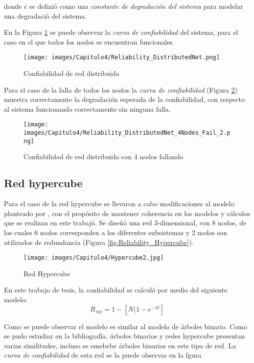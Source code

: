 donde c se definió como una \textit{constante de degradación del sistema} para modelar una degradació del sistema.

En la Figura \ref{fig:reliability_distributedNet} se puede observar la \textit{curva de confiabilidad} del sistema, para el caso en el que todos los nodos se encuentran funcionales.

\begin{figure}[H]
 \centering
 \texttt{[image: images/Capitulo4/Reliability\_DistributedNet.png]}
  \caption{Confiabilidad de red distribuida}
\label{fig:reliability_distributedNet}
\end{figure}


Para el caso de la falla de todos los nodos la \textit{curva de confiabilidad} (Figura \ref{fig:reliability_distributedNet_4Nodes_Fail}) muestra correctamente la degradación esperada de la confiabilidad, con respecto al sistema funcionando correctamente sin ninguna falla.

\begin{figure}[H]
 \centering
 \texttt{[image: images/Capitulo4/Reliability\_DistributedNet\_4Nodes\_Fail\_2.png]}
  \caption{Confiabilidad de red distribuida con 4 nodos fallando}
\label{fig:reliability_distributedNet_4Nodes_Fail}
\end{figure}

\subsection{Red hypercube}
Para el caso de la red hypercube se llevaron a cabo modificaciones al modelo planteado por \cite{Mostafa14}, con el propósito de mantener coherencia en los modelos y cálculos que se realizan en este trabajó. Se diseñó una red 3-dimensional, con 8 nodos,  de los cuales 6 nodos corresponden a los diferentes subsistemas y 2 nodos son utilizados de redundancia (Figura \ref{fig:Reliability_Hypercube}).

\begin{figure}[H]
 \centering
 \texttt{[image: images/Capitulo4/Hypercube2.jpg]}
  \caption{Red Hypercube}
\label{fig:Hypercube}
\end{figure}

En este trabajo de tesis, la confiabilidad se calculó por medio del siguiente modelo: $$R_{sys} = 1- [N (1 - e^{- \lambda t}]$$

Como se puede observar el modelo es similar al modelo de árboles binario. Como se pudo estudiar en la bibliografía, árboles binarios y redes hypercube presentan varias similitudes, incluso se emebebe árboles binarios en este tipo de red. La \textit{curva de confiabilidad} de esta red se la puede observar en la fgura

